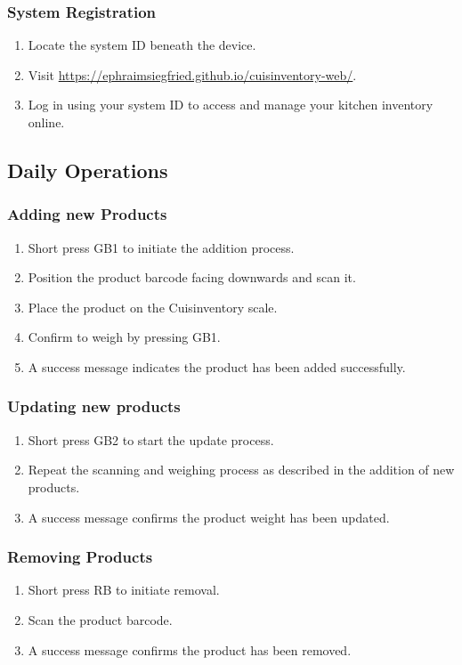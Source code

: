 \documentclass{article}
\begin{document}
\subsubsection{System Registration}
\begin{enumerate}
	\item Locate the system ID beneath the device.
	\item Visit \url{https://ephraimsiegfried.github.io/cuisinventory-web/}.
	\item Log in using your system ID to access and manage your kitchen inventory online.
\end{enumerate}

\subsection{Daily Operations}
\subsubsection{Adding new Products}
\begin{enumerate}
	\item Short press GB1 to initiate the addition process.
	\item Position the product barcode facing downwards and scan it.
	\item Place the product on the Cuisinventory scale.
	\item Confirm to weigh by pressing GB1.
	\item A success message indicates the product has been added successfully.
\end{enumerate}

\subsubsection{Updating new products}
\begin{enumerate}
	\item Short press GB2 to start the update process.
	\item Repeat the scanning and weighing process as described in the addition of new products.
	\item A success message confirms the product weight has been updated.
\end{enumerate}

\subsubsection{Removing Products}
\begin{enumerate}
	\item Short press RB to initiate removal.
	\item Scan the product barcode.
	\item A success message confirms the product has been removed.
\end{enumerate}
\end{document}
